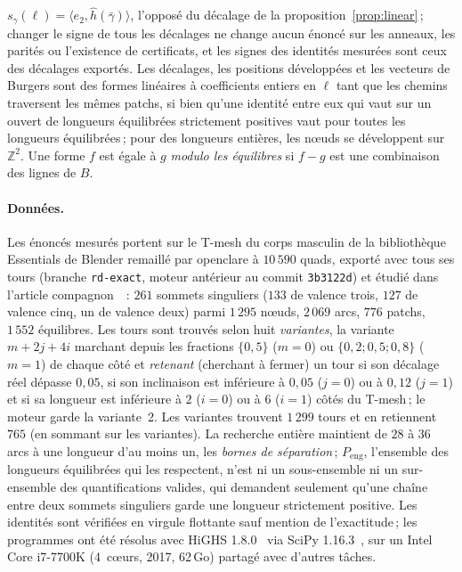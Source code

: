 \documentclass[11pt,a4paper]{article}
\newcommand{\Z}{\mathbb{Z}}
\newcommand{\shift}{s}
\begin{document}
$\shift_\gamma(\ell) = \langle e_2, \hat h(\bar\gamma) \rangle$, l'opposé du
décalage de la proposition~\ref{prop:linear}\,; changer le signe de tous les
décalages ne change aucun énoncé sur les anneaux, les parités ou l'existence
de certificats, et les signes des identités mesurées sont ceux des décalages
exportés. Les décalages, les positions développées et les vecteurs de Burgers
sont des formes linéaires à coefficients entiers en $\ell$ tant que les
chemins traversent les mêmes patchs, si bien qu'une identité entre eux qui
vaut sur un ouvert de longueurs équilibrées strictement positives vaut pour
toutes les longueurs équilibrées\,; pour des longueurs entières, les nœuds se
développent sur $\Z^2$. Une forme $f$ est égale à $g$ \emph{modulo les
équilibres} si $f - g$ est une combinaison des lignes de $B$.

\paragraph{Données.}
Les énoncés mesurés portent sur le T-mesh du corps masculin de la
bibliothèque Essentials de Blender remaillé par openclare à $10\,590$ quads,
exporté avec tous ses tours (branche \texttt{rd-exact}, moteur antérieur au
commit \texttt{3b3122d}) et étudié dans l'article
compagnon~\cite[\S7]{gardent2026loops}~: $261$ sommets singuliers ($133$ de
valence trois, $127$ de valence cinq, un de valence deux) parmi $1\,295$
nœuds, $2\,069$ arcs, $776$ patchs, $1\,552$ équilibres. Les tours sont
trouvés selon huit \emph{variantes}, la variante $m + 2j + 4i$ marchant depuis
les fractions $\{0,5\}$ ($m = 0$) ou $\{0,2 ; 0,5 ; 0,8\}$ ($m = 1$) de chaque
côté et \emph{retenant} (cherchant à fermer) un tour si son décalage réel
dépasse $0,05$, si son inclinaison est inférieure à $0,05$ ($j = 0$) ou à
$0,12$ ($j = 1$) et si sa longueur est inférieure à $2$ ($i = 0$) ou à $6$ ($i
= 1$) côtés du T-mesh\,; le moteur garde la variante~2. Les variantes
trouvent $1\,299$ tours et en retiennent $765$ (en sommant sur les
variantes). La recherche entière maintient de $28$ à $36$ arcs à une longueur
d'au moins un, les \emph{bornes de séparation}\,; $P_{\mathrm{eng}}$,
l'ensemble des longueurs équilibrées qui les respectent, n'est ni un
sous-ensemble ni un sur-ensemble des quantifications valides, qui demandent
seulement qu'une chaîne entre deux sommets singuliers garde une longueur
strictement positive. Les identités sont vérifiées en virgule flottante sauf
mention de l'exactitude\,; les programmes ont été résolus avec HiGHS
1.8.0~\cite{huangfu2018highs} via SciPy 1.16.3~\cite{virtanen2020scipy}, sur
un Intel Core i7-7700K (4~cœurs, 2017, 62\,Go) partagé avec d'autres tâches.
\end{document}
